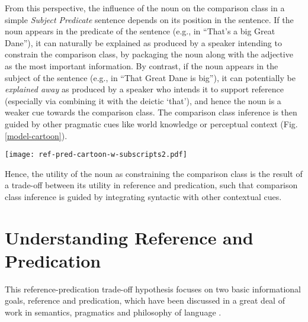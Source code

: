 From this perspective, the influence of the noun on the comparison class in a simple \textit{Subject Predicate} sentence depends on its position in the sentence. If the noun appears in the predicate of the sentence (e.g., in “That’s a big Great Dane”), it can naturally be explained as produced by a speaker intending to constrain the comparison class, by packaging the noun along with the adjective as the most important information. By contrast, if the noun appears in the subject of the sentence (e.g., in “That Great Dane is big”), it can potentially be \emph{explained away} as produced by a speaker who intends it to support reference (especially via combining it with the deictic ‘that’), and hence the noun is a weaker cue towards the comparison class. The comparison class inference is then guided by other pragmatic cues like world knowledge or perceptual context (Fig. \ref{model-cartoon}).

\begin{figure*}[t]
	\begin{center}
		\texttt{[image: ref-pred-cartoon-w-subscripts2.pdf]}
	\end{center}
	\caption{Cartoon of the inferential account for comparison class determination. The noun (Great Dane) in a sentence can be employed either for the goal of reference (green) or predication (purple), shown in the case when this distinction is made via the syntactic position of the noun (subject S~vs.~predicate P). When the noun is used for reference (top), a listener is left with uncertainty about what to use as the comparison class (dogs or Great Danes) and integrates their world knowledge and the physical context to make this inference.  When the noun is used for predication (bottom), the listener should have less uncertainty about the comparison class: The comparison class is stipulated by the noun.}
	\label{model-cartoon}
\end{figure*}
 
Hence, the utility of the noun as constraining the comparison class is the result of a trade-off between its utility in reference and predication, such that comparison class inference is guided by integrating syntactic with other contextual cues.

\section{Understanding Reference and Predication}
\label{3.1.}
This reference-predication trade-off hypothesis focuses on two basic informational goals, reference and predication, which have been discussed in a great deal of work in semantics, pragmatics and philosophy of language \parencite{michaelson2019, Reboul2001}.
 

